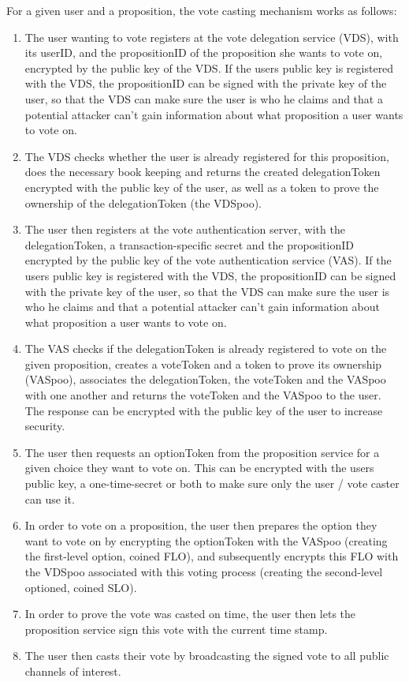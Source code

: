 For a given user and a proposition, the vote casting mechanism works as follows:
\begin{enumerate}
\item The user wanting to vote registers at the 
vote delegation service (VDS), with its userID, and the propositionID of the proposition she wants to vote on, encrypted by the public key of the VDS. If the users public key is registered with the VDS, the propositionID can be signed with the private key of the user, so that the VDS can make sure  the user is who he claims and that a potential attacker can't gain information about what proposition a user wants to vote on.
\item The VDS checks whether the user is already registered for this proposition, does the necessary book keeping and returns the created delegationToken encrypted with the public key of the user, as well as a token to prove the ownership of the delegationToken (the VDSpoo).
\item The user then registers at the vote authentication server, with the delegationToken, a transaction-specific secret and the propositionID encrypted by the public key of the vote authentication service (VAS). If the users public key is registered with the VDS, the propositionID can be signed with the private key of the user, so that the VDS can make sure  the user is who he claims and that a potential attacker can't gain information about what proposition a user wants to vote on.
\item The VAS checks if the delegationToken is already registered to vote on the given proposition, creates a voteToken and a token to prove its ownership (VASpoo), associates the delegationToken, the voteToken and the VASpoo with one another and returns the voteToken and the VASpoo to the user. The response can be encrypted with the public key of the user to increase security.
\item The user then requests an optionToken from the proposition service for a given choice they want to vote on. This can be encrypted with the users public key, a one-time-secret or both to make sure only the user / vote caster can use it.
\item In order to vote on a proposition, the user then prepares the option they want to vote on by encrypting the optionToken with the VASpoo (creating the first-level option, coined FLO), and subsequently encrypts this FLO with the VDSpoo associated with this voting process (creating the second-level optioned, coined SLO).
\item In order to prove the vote was casted on time, the user then lets the proposition service sign this vote with the current time stamp.
\item The user then casts their vote by broadcasting the signed vote to all public channels of interest.
\end{enumerate}

